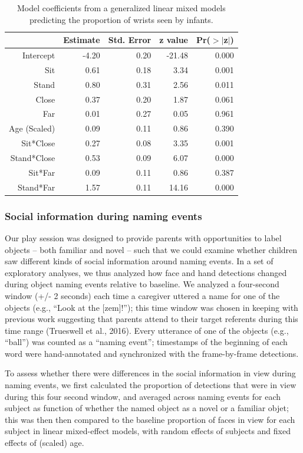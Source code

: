\documentclass[english,man]{apa6}
\begin{document}
\begin{table}[ht]
\centering
\begin{tabular}{rrrrr}
  \hline
 & Estimate & Std. Error & z value & Pr($>$$|$z$|$) \\ 
  \hline
Intercept & -4.20 & 0.20 & -21.48 & 0.000 \\ 
  Sit & 0.61 & 0.18 & 3.34 & 0.001 \\ 
  Stand & 0.80 & 0.31 & 2.56 & 0.011 \\ 
  Close & 0.37 & 0.20 & 1.87 & 0.061 \\ 
  Far & 0.01 & 0.27 & 0.05 & 0.961 \\ 
  Age (Scaled) & 0.09 & 0.11 & 0.86 & 0.390 \\ 
  Sit*Close & 0.27 & 0.08 & 3.35 & 0.001 \\ 
  Stand*Close & 0.53 & 0.09 & 6.07 & 0.000 \\ 
  Sit*Far & 0.09 & 0.11 & 0.86 & 0.387 \\ 
  Stand*Far & 1.57 & 0.11 & 14.16 & 0.000 \\ 
   \hline
\end{tabular}
\caption{Model coefficients from a generalized linear mixed models predicting the proportion of wrists seen by infants.} 
\end{table}

\subsubsection{Social information during naming
events}\label{social-information-during-naming-events}

Our play session was designed to provide parents with opportunities to
label objects -- both familiar and novel -- such that we could examine
whether children saw different kinds of social information around naming
events. In a set of exploratory analyses, we thus analyzed how face and
hand detections changed during object naming events relative to
baseline. We analyzed a four-second window (+/- 2 seconds) each time a
caregiver uttered a name for one of the objects (e.g., \enquote{Look at
the {[}zem{]}!}); this time window was chosen in keeping with previous
work suggesting that parents attend to their target referents during
this time range (Trueswell et al., 2016). Every utterance of one of the
objects (e.g., \enquote{ball}) was counted as a \enquote{naming event};
timestamps of the beginning of each word were hand-annotated and
synchronized with the frame-by-frame detections.

To assess whether there were differences in the social information in
view during naming events, we first calculated the proportion of
detections that were in view during this four second window, and
averaged across naming events for each subject as function of whether
the named object as a novel or a familiar objet; this was then then
compared to the baseline proportion of faces in view for each subject in
linear mixed-effect models, with random effects of subjects and fixed
effects of (scaled) age.
\end{document}
